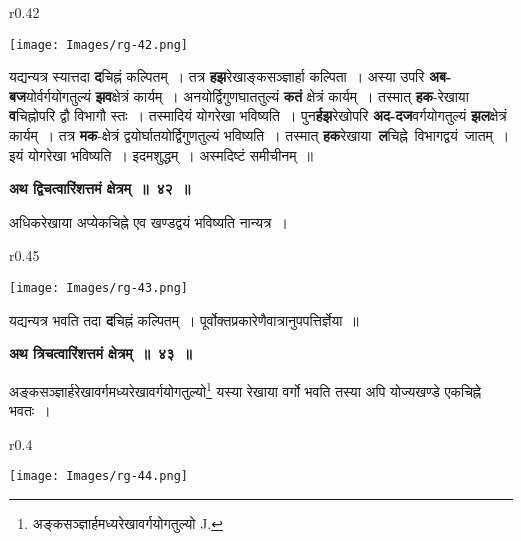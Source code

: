 \documentclass[11pt, openany]{book}
\begin{document}
\begin{wrapfigure}{r}{0.42\textwidth}
\vspace{-8mm}
\begin{center}
\texttt{[image: Images/rg-42.png]}
\end{center}
\vspace{-8mm}
\end{wrapfigure}

यद्यन्यत्र स्यात्तदा \textbf{द}चिह्नं कल्पितम्~। तत्र \textbf{हझ}रेखाङ्कसञ्ज्ञार्हा कल्पिता~। अस्या उपरि \textbf{अब-बज}योर्वर्गयोगतुल्यं \textbf{झव}क्षेत्रं कार्यम्~। अनयोर्द्विगुणघाततुल्यं \textbf{कतं} क्षेत्रं कार्यम्~। तस्मात् \textbf{हक}-रेखाया \textbf{व}चिह्नोपरि द्वौ विभागौ स्तः~। तस्मादियं योगरेखा भविष्यति~। पुन\textbf{र्हझ}रेखोपरि \textbf{अद-दज}वर्गयोगतुल्यं \textbf{झल}क्षेत्रं कार्यम्~। तत्र \textbf{मक}-क्षेत्रं द्वयोर्घातयोर्द्विगुणतुल्यं भविष्यति~। तस्मात् \textbf{हक}रेखाया \,\textbf{ल}चिह्ने \,विभागद्वयं \,जातम्~। इयं योगरेखा भविष्यति~। इदमशुद्धम्~। अस्मदिष्टं समीचीनम्~॥ 
\vspace{2mm}

\begin{center}
\textbf{\large अथ द्विचत्वारिंशत्तमं क्षेत्रम्~॥~४२~॥}
\end{center}

{\ab अधिकरेखाया अप्येकचिह्ने एव खण्डद्वयं भविष्यति नान्यत्र~।}\\ 

\begin{wrapfigure}{r}{0.45\textwidth}
\vspace{-12mm}
\begin{center}
\texttt{[image: Images/rg-43.png]}
\end{center}
\vspace{-8mm}
\end{wrapfigure}

 यद्यन्यत्र भवति तदा \textbf{द}चिह्नं कल्पितम्~। पूर्वोक्तप्रकारेणैवात्रानुपपत्तिर्ज्ञेया~॥

\newpage
\begin{center}
\textbf{\large अथ त्रिचत्वारिंशत्तमं क्षेत्रम्~॥~४३~॥ }
\end{center}

{\ab अङ्कसञ्ज्ञार्हरेखावर्गमध्यरेखावर्गयोगतुल्यो\renewcommand{\thefootnote}{१}\footnote{अङ्कसञ्ज्ञार्हमध्यरेखावर्गयोगतुल्यो {\en J.}} \;यस्या \;रेखाया \;वर्गो \;भवति तस्या अपि योज्यखण्डे एकचिह्ने भवतः~। }\\

\begin{wrapfigure}{r}{0.4\textwidth}
\vspace{-12mm}
\begin{center}
\texttt{[image: Images/rg-44.png]}
\end{center}
\vspace{-8mm}
\end{wrapfigure}
\end{document}
